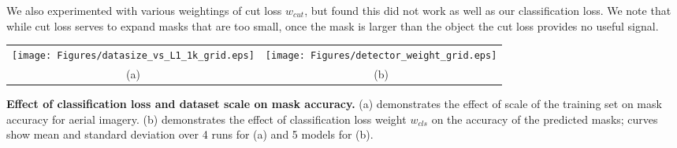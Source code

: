 \documentclass[runningheads]{llncs}
\begin{document}
We also experimented with various weightings of cut loss $w_{cut}$, but found this did not work as well as our classification loss.
We note that while cut loss serves to expand masks that are too small, once the mask is larger than the object the cut loss provides no useful signal. 

\centering
\begin{tabular}{ c c }
    \texttt{[image: Figures/datasize\_vs\_L1\_1k\_grid.eps]} &
    \texttt{[image: Figures/detector\_weight\_grid.eps]} \\
  
  (a) & (b) \\
  \end{tabular}
  \caption{
  \textbf{Effect of classification loss and dataset scale on mask accuracy.} 
  (a) demonstrates the effect of scale of the training set
  on mask accuracy for aerial imagery.
   (b) demonstrates the effect of classification loss weight $w_{cls}$ on the accuracy of the predicted masks; curves show mean and standard deviation over 4 runs for (a) and 5 models for (b).}
  \label{figure:aerial_plots}
\end{document}
